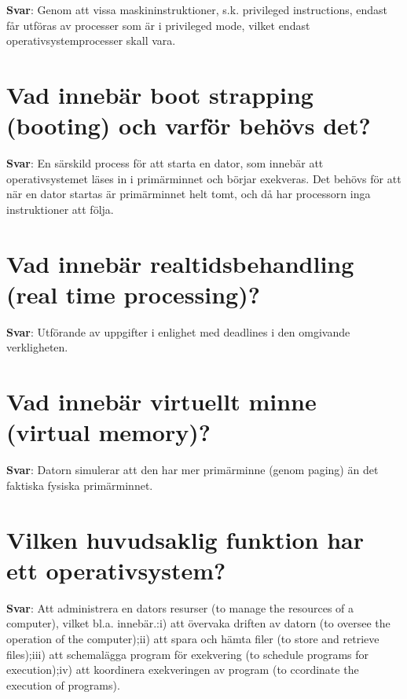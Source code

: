 \documentclass[a4paper,11pt,oneside]{book}
\begin{document}
\begin{sloppypar}
\label{q:104:sa:sv:True}

\textbf{Svar}: Genom att vissa maskininstruktioner, s.k. privileged instructions, endast f\r{a}r utf\"oras av processer som \"ar i privileged mode, vilket endast operativsystemprocesser skall vara.



\section{Vad inneb\"ar boot strapping (booting) och varf\"or beh\"ovs det?}

\label{q:105:sa:sv:True}

\textbf{Svar}: En s\"arskild process f\"or att starta en dator, som inneb\"ar att operativsystemet l\"ases in i prim\"arminnet och b\"orjar exekveras. Det beh\"ovs f\"or att n\"ar en dator startas \"ar prim\"arminnet helt tomt, och d\r{a} har processorn inga instruktioner att f\"olja.



\section{Vad inneb\"ar realtidsbehandling (real time processing)?}

\label{q:106:sa:sv:True}

\textbf{Svar}: Utf\"orande av uppgifter i enlighet med deadlines i den omgivande verkligheten.



\section{Vad inneb\"ar virtuellt minne (virtual memory)?}

\label{q:108:sa:sv:True}

\textbf{Svar}: Datorn simulerar att den har mer prim\"arminne (genom paging) \"an det faktiska fysiska prim\"arminnet.



\section{Vilken huvudsaklig funktion har ett operativsystem?}

\label{q:109:sa:sv:True}

\textbf{Svar}: Att administrera en dators resurser (to manage the resources of a computer), vilket bl.a. inneb\"ar.:i) att \"overvaka driften av datorn (to oversee the operation of the computer);ii) att spara och h\"amta filer (to store and retrieve files);iii) att schemal\"agga program f\"or exekvering (to schedule programs for execution);iv) att koordinera exekveringen av program (to ccordinate the execution of programs).




\end{sloppypar}
\end{document}
